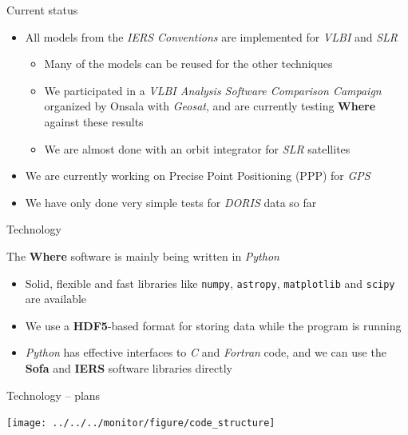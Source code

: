 \documentclass[ignorenonframetext,12pt,t]{beamer}
\begin{document}
\begin{frame}{Current status}

\begin{itemize}
\item
  All models from the \emph{IERS Conventions} are implemented for
  \emph{VLBI} and \emph{SLR}

  \begin{itemize}
  \item
    Many of the models can be reused for the other techniques
  \item
    We participated in a \emph{VLBI Analysis Software Comparison
    Campaign} organized by Onsala with \emph{Geosat}, and are currently
    testing \textbf{Where} against these results
  \item
    We are almost done with an orbit integrator for \emph{SLR}
    satellites
  \end{itemize}
\item
  We are currently working on Precise Point Positioning (PPP) for
  \emph{GPS}
\item
  We have only done very simple tests for \emph{DORIS} data so far
\end{itemize}

\end{frame}

\begin{frame}[fragile]{Technology}

The \textbf{Where} software is mainly being written in \emph{Python}

\begin{itemize}
\item
  Solid, flexible and fast libraries like \texttt{numpy},
  \texttt{astropy}, \texttt{matplotlib} and \texttt{scipy} are available
\item
  We use a \textbf{HDF5}-based format for storing data while the program
  is running
\item
  \emph{Python} has effective interfaces to \emph{C} and \emph{Fortran}
  code, and we can use the \textbf{Sofa} and \textbf{IERS} software
  libraries directly
\end{itemize}

\end{frame}

\begin{frame}{Technology -- plans}

\texttt{[image: ../../../monitor/figure/code\_structure]}

\end{frame}
\end{document}
